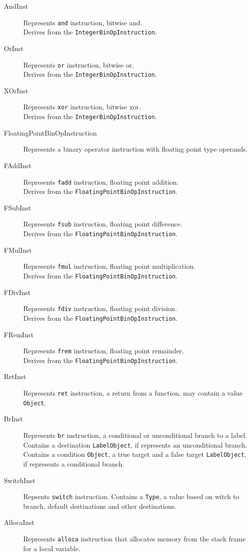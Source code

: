 \documentclass[a4paper,oneside,11pt]{book}
\theoremstyle{definition}
\begin{document}
\begin{description}
\item[AndInst]
Represents \verb|and| instruction, bitwise and.\\Derives from the \verb|IntegerBinOpInstruction|.
\item[OrInst]
Represents \verb|or| instruction, bitwise or.\\Derives from the \verb|IntegerBinOpInstruction|.
\item[XOrInst]
Represents \verb|xor| instruction, bitwise xor.\\Derives from the \verb|IntegerBinOpInstruction|.
\item[FloatingPointBinOpInstruction]
Represents a binary operator instruction with floating point type operands.
\item[FAddInst]
Represents \verb|fadd| instruction, floating point addition.\\Derives from the \verb|FloatingPointBinOpInstruction|.
\item[FSubInst]
Represents \verb|fsub| instruction, floating point difference.\\Derives from the \verb|FloatingPointBinOpInstruction|.
\item[FMulInst]
Represents \verb|fmul| instruction, floating point multiplication.\\Derives from the \verb|FloatingPointBinOpInstruction|.
\item[FDivInst]
Represents \verb|fdiv| instruction, floating point division.\\Derives from the \verb|FloatingPointBinOpInstruction|.
\item[FRemInst]
Represents \verb|frem| instruction, floating point remainder.\\Derives from the \verb|FloatingPointBinOpInstruction|.
\item[RetInst]
Represents \verb|ret| instruction, a return from a function, may contain a value \verb|Object|.
\item[BrInst]
Represents \verb|br| instruction, a conditional or unconditional branch to a label.
Contains a destination \verb|LabelObject|, if represents an unconditional branch.
Contains a condition \verb|Object|, a true target and a false target \verb|LabelObject|, if represents a conditional branch.
\item[SwitchInst]
Repsents \verb|switch| instruction.
Contains a \verb|Type|, a value based on witch to branch, default destinations and other destinations.
\item[AllocaInst]
Represents \verb|alloca| instruction that allocates memory from the stack frame for a local variable.

\end{description}
\end{document}
